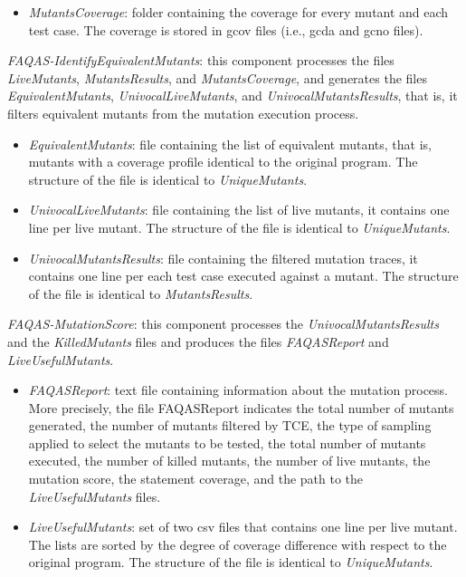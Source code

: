 \begin{itemize}
{\begin{itemize}
\begin{itemize}
				
				\item \textit{MutantsCoverage}: folder containing the coverage for every mutant and each test case. The coverage is stored in gcov files (i.e., gcda and gcno files).
			\end{itemize}
		\end{itemize}

	\item \textit{FAQAS-IdentifyEquivalentMutants}: this component processes the files \textit{LiveMutants}, \textit{MutantsResults}, and \textit{MutantsCoverage}, and generates the files \textit{EquivalentMutants}, \textit{UnivocalLiveMutants}, and \textit{UnivocalMutantsResults}, that is, it filters equivalent mutants from the mutation execution process.
	\begin{itemize}
		\item \textit{EquivalentMutants}: file containing the list of equivalent mutants, that is, mutants with a coverage profile identical to the original program. The structure of the file is identical to \textit{UniqueMutants}.
		\item \textit{UnivocalLiveMutants}: file containing the list of live mutants, it contains one line per live mutant. The structure of the file is identical to \textit{UniqueMutants}.
		\item \textit{UnivocalMutantsResults}: file containing the filtered mutation traces, it contains one line per each test case executed against a mutant. The structure of the file is identical to \textit{MutantsResults}.

	\end{itemize}

	\item \textit{FAQAS-MutationScore}: this component processes the \textit{UnivocalMutantsResults} and the \textit{KilledMutants} files and produces the files \textit{FAQASReport} and \textit{LiveUsefulMutants}.

	\begin{itemize}
		\item \textit{FAQASReport}: text file containing information about the \MASS mutation process. More precisely, the file FAQASReport indicates the total number of mutants generated, the number of mutants filtered by TCE, the type of sampling applied to select the mutants to be tested, the total number of mutants executed, the number of killed mutants, the number of live mutants, the mutation score, the statement coverage, and the  path to the \textit{LiveUsefulMutants} files.
		
		\item \textit{LiveUsefulMutants}: set of two csv files that contains one line per live mutant. The lists are sorted by the degree of coverage difference with respect to the original program. The structure of the file is identical to \textit{UniqueMutants}.
	\end{itemize}
	}
\end{itemize}


